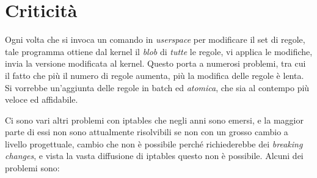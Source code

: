 \section{Criticità}
Ogni volta che si invoca un comando in \textit{userspace} per modificare il set
di regole, tale programma ottiene dal kernel il \textit{blob}
di \textit{tutte} le regole, vi applica le modifiche, invia la versione
modificata al kernel.
Questo porta a numerosi problemi, tra cui il fatto che più il numero di regole
aumenta, più la modifica delle regole è lenta.
Si vorrebbe un'aggiunta delle regole in batch ed \textit{atomica}, che
sia al contempo più veloce ed affidabile.

Ci sono vari altri problemi con iptables che negli anni sono emersi, e la
maggior parte di essi non sono attualmente risolvibili se non con un grosso
cambio a livello progettuale, cambio che non è possibile perché richiederebbe
dei \textit{breaking changes}, e vista la vasta diffusione di iptables questo
non è possibile.
Alcuni dei problemi sono:
